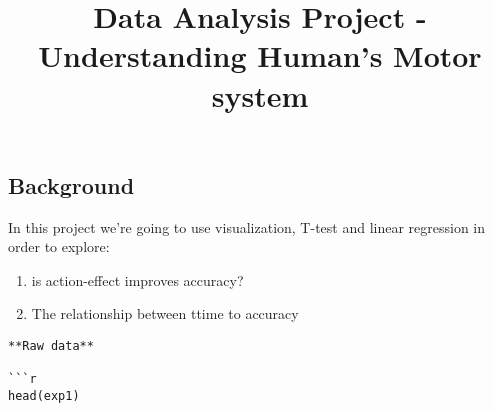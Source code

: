 \documentclass[
]{article}
\title{Data Analysis Project - Understanding Human's Motor system}
\author{}
\date{\vspace{-2.5em}}
\begin{document}
\maketitle

\hypertarget{background}{%
\subsection{\texorpdfstring{\textbf{Background}}{Background}}\label{background}}

In this project we're going to use visualization, T-test and linear
regression in order to explore:

\begin{enumerate}
\def\labelenumi{\arabic{enumi}.}
\item
  is action-effect improves accuracy?
\item
  The relationship between ttime to accuracy
\end{enumerate}

\begin{verbatim}
**Raw data**

```r
head(exp1)
\end{verbatim}
\end{document}
